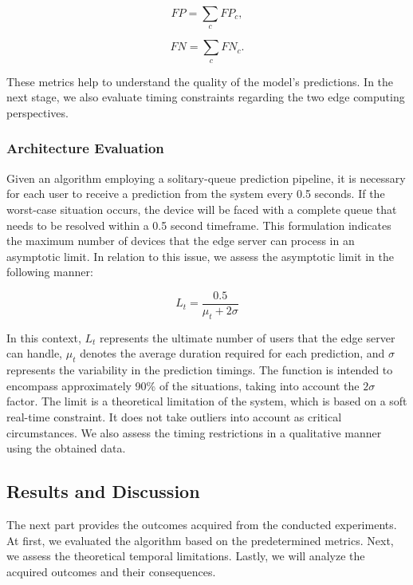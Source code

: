 \begin{equation}
    FP = \sum_c FP_c,
\end{equation}

\begin{equation}
    FN = \sum_c FN_c.
\end{equation}

These metrics help to understand the quality of the model's predictions. In the next stage, we also evaluate timing constraints regarding the two edge computing perspectives. 


\subsubsection{Architecture Evaluation}

Given an algorithm employing a solitary-queue prediction pipeline, it is necessary for each user to receive a prediction from the system every 0.5 seconds. If the worst-case situation occurs, the device will be faced with a complete queue that needs to be resolved within a 0.5 second timeframe. This formulation indicates the maximum number of devices that the edge server can process in an asymptotic limit. In relation to this issue, we assess the asymptotic limit in the following manner:

\begin{equation}
\label{eq:limit}
    L_t = \frac{0.5}{\mu_t+2\sigma}
\end{equation}

In this context, $L_t$ represents the ultimate number of users that the edge server can handle, $\mu_t$ denotes the average duration required for each prediction, and $\sigma$ represents the variability in the prediction timings. The function is intended to encompass approximately 90\% of the situations, taking into account the $2\sigma$ factor. The limit is a theoretical limitation of the system, which is based on a soft real-time constraint. It does not take outliers into account as critical circumstances. We also assess the timing restrictions in a qualitative manner using the obtained data.

\subsection{Results and Discussion}

The next part provides the outcomes acquired from the conducted experiments. At first, we evaluated the algorithm based on the predetermined metrics. Next, we assess the theoretical temporal limitations. Lastly, we will analyze the acquired outcomes and their consequences.

